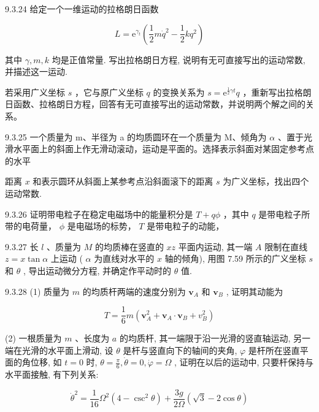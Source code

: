 \begin{problem}{9.3.24}
给定一个一维运动的拉格朗日函数

\[
L = \mathrm{e} ^ {\gamma_ {t}} \left(\frac {1}{2} m \dot {q} ^ {2} - \frac {1}{2} k q ^ {2}\right)
\]

其中 $\gamma, m, k$ 均是正值常量. 写出拉格朗日方程, 说明有无可直接写出的运动常数, 并描述这一运动.

若采用广义坐标 $s$ ，它与原广义坐标 $q$ 的变换关系为 $s = \mathrm{e}^{\frac{1}{2}\gamma t} q$ ，重新写出拉格朗日函数、拉格朗日方程，回答有无可直接写出的运动常数，并说明两个解之间的关系。
\end{problem}
\clearpage


\begin{problem}{9.3.25}
一个质量为 m、半径为 a 的均质圆环在一个质量为 M、倾角为 $\alpha$ 、置于光滑水平面上的斜面上作无滑动滚动，运动是平面的。选择表示斜面对某固定参考点的水平

距离 $x$ 和表示圆环从斜面上某参考点沿斜面滚下的距离 $s$ 为广义坐标，找出四个运动常数.
\begin{center}

\end{center}
\end{problem}
\clearpage


\begin{problem}{9.3.26}
证明带电粒子在稳定电磁场中的能量积分是 $T + q\phi$ ，其中 $q$ 是带电粒子所带的电荷量， $\phi$ 是电磁场的标势， $T$ 是带电粒子的动能，
\end{problem}
\clearpage


\begin{problem}{9.3.27}
长 $l$ 、质量为 $M$ 的均质棒在竖直的 $xz$ 平面内运动, 其一端 $A$ 限制在直线 $z = x \tan \alpha$ 上运动 ( $\alpha$ 为直线对水平的 $x$ 轴的倾角), 用图 7.59 所示的广义坐标 $s$ 和 $\theta$ , 导出运动微分方程, 并确定作平动时的 $\theta$ 值.
\begin{center}

\end{center}
\end{problem}
\clearpage


\begin{problem}{9.3.28}
(1) 质量为 $m$ 的均质杆两端的速度分别为 $\bm{v}_A$ 和 $\bm{v}_B$ , 证明其动能为

\[
T = \frac {1}{6} m (\boldsymbol {v} _ {A} ^ {2} + \boldsymbol {v} _ {A} \cdot \boldsymbol {v} _ {B} + v _ {B} ^ {2})
\]

(2) 一根质量为 $m$ 、长度为 $a$ 的均质杆, 其一端限于沿一光滑的竖直轴运动, 另一端在光滑的水平面上滑动, 设 $\theta$ 是杆与竖直向下的轴间的夹角, $\varphi$ 是杆所在竖直平面的角位移, 如 $t=0$ 时, $\theta=\frac{\pi}{6}, \dot{\theta}=0, \dot{\varphi}=\Omega$ , 证明在以后的运动中, 只要杆保持与水平面接触, 有下列关系:

\[
\dot {\theta} ^ {2} = \frac {1}{1 6} \Omega^ {2} (4 - \csc^ {2} \theta) + \frac {3 g}{2 \Omega} (\sqrt {3} - 2 \cos \theta)
\]
\end{problem}
\clearpage


